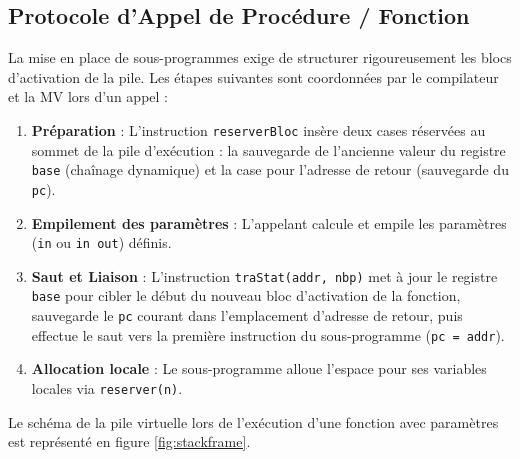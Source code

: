 \documentclass[a4paper, 12pt]{article}
\begin{document}
\subsection{Protocole d'Appel de Procédure / Fonction}
La mise en place de sous-programmes exige de structurer rigoureusement les blocs d'activation de la pile. Les étapes suivantes sont coordonnées par le compilateur et la MV lors d'un appel :
\begin{enumerate}
    \item \textbf{Préparation} : L'instruction \texttt{reserverBloc} insère deux cases réservées au sommet de la pile d'exécution : la sauvegarde de l'ancienne valeur du registre \texttt{base} (chaînage dynamique) et la case pour l'adresse de retour (sauvegarde du \texttt{pc}).
    \item \textbf{Empilement des paramètres} : L'appelant calcule et empile les paramètres (\texttt{in} ou \texttt{in out}) définis.
    \item \textbf{Saut et Liaison} : L'instruction \texttt{traStat(}\allowbreak\texttt{addr, }\allowbreak\texttt{nbp)} met à jour le registre \texttt{base} pour cibler le début du nouveau bloc d'activation de la fonction, sauvegarde le \texttt{pc} courant dans l'emplacement d'adresse de retour, puis effectue le saut vers la première instruction du sous-programme (\texttt{pc = addr}).
    \item \textbf{Allocation locale} : Le sous-programme alloue l'espace pour ses variables locales via \texttt{reserver(n)}.
\end{enumerate}

Le schéma de la pile virtuelle lors de l'exécution d'une fonction avec paramètres est représenté en figure \ref{fig:stackframe}.
\end{document}
